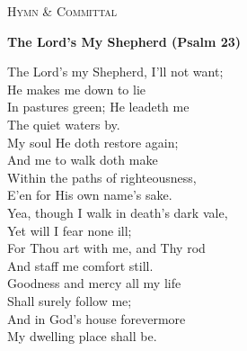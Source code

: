 
\begin{center}
  {\Large\scshape\color{primary} Hymn \& Committal}
  \thinseparator
\end{center}

\vspace{2mm}

\begin{center}
  \textbf{\color{primary} The Lord's My Shepherd (Psalm 23)}
\end{center}

\begin{center}\small
  The Lord’s my Shepherd, I’ll not want;\\
  He makes me down to lie\\
  In pastures green; He leadeth me\\
  The quiet waters by.\\[6pt]

  My soul He doth restore again;\\
  And me to walk doth make\\
  Within the paths of righteousness,\\
  E'en for His own name's sake.\\[6pt]

  Yea, though I walk in death’s dark vale,\\
  Yet will I fear none ill;\\
  For Thou art with me, and Thy rod\\
  And staff me comfort still.\\[6pt]

  Goodness and mercy all my life\\
  Shall surely follow me;\\
  And in God’s house forevermore\\
  My dwelling place shall be.
\end{center}

\thinseparator


\vfill
